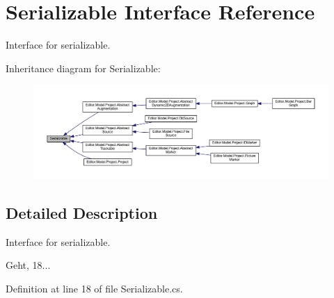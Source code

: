 \section{Serializable Interface Reference}
\label{interface_serializable}


Interface for serializable.  




Inheritance diagram for Serializable\-:
\nopagebreak
\begin{figure}[H]
\begin{center}
\leavevmode
\includegraphics[width=350pt]{interface_serializable__inherit__graph}
\end{center}
\end{figure}


\subsection{Detailed Description}
Interface for serializable. 

Geht, 18... 

Definition at line 18 of file Serializable.\-cs.

